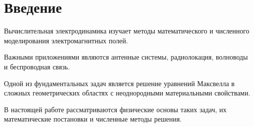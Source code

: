 \section{Введение}
\label{sec:introduction}

Вычислительная электродинамика изучает
методы математического и численного
моделирования электромагнитных полей.

Важными приложениями являются
антенные системы, радиолокация,
волноводы и беспроводная связь.

Одной из фундаментальных задач является
решение уравнений Максвелла
в сложных геометрических областях
с неоднородными материальными свойствами.

В настоящей работе рассматриваются
физические основы таких задач,
их математические постановки
и численные методы решения.
